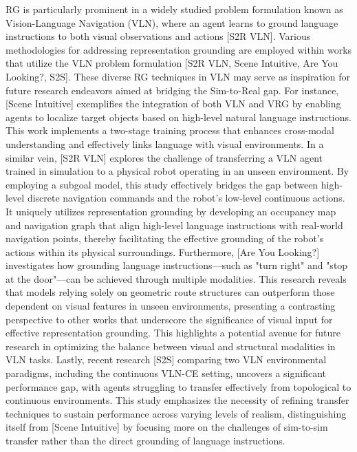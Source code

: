 RG is particularly prominent in a widely studied problem formulation known as Vision-Language Navigation (VLN), where an agent learns to ground language instructions to both visual observations and actions [S2R VLN]. Various methodologies for addressing representation grounding are employed within works that utilize the VLN problem formulation [S2R VLN, Scene Intuitive, Are You Looking?, S2S]. These diverse RG techniques in VLN may serve as inspiration for future research endeavors aimed at bridging the Sim-to-Real gap. For instance, [Scene Intuitive] exemplifies the integration of both VLN and VRG by enabling agents to localize target objects based on high-level natural language instructions. This work implements a two-stage training process that enhances cross-modal understanding and effectively links language with visual environments. In a similar vein, [S2R VLN] explores the challenge of transferring a VLN agent trained in simulation to a physical robot operating in an unseen environment. By employing a subgoal model, this study effectively bridges the gap between high-level discrete navigation commands and the robot's low-level continuous actions. It uniquely utilizes representation grounding by developing an occupancy map and navigation graph that align high-level language instructions with real-world navigation points, thereby facilitating the effective grounding of the robot's actions within its physical surroundings. Furthermore, [Are You Looking?] investigates how grounding language instructions—such as "turn right" and "stop at the door"—can be achieved through multiple modalities. This research reveals that models relying solely on geometric route structures can outperform those dependent on visual features in unseen environments, presenting a contrasting perspective to other works that underscore the significance of visual input for effective representation grounding. This highlights a potential avenue for future research in optimizing the balance between visual and structural modalities in VLN tasks. Lastly, recent research [S2S] comparing two VLN environmental paradigms, including the continuous VLN-CE setting, uncovers a significant performance gap, with agents struggling to transfer effectively from topological to continuous environments. This study emphasizes the necessity of refining transfer techniques to sustain performance across varying levels of realism, distinguishing itself from [Scene Intuitive] by focusing more on the challenges of sim-to-sim transfer rather than the direct grounding of language instructions.
\\

